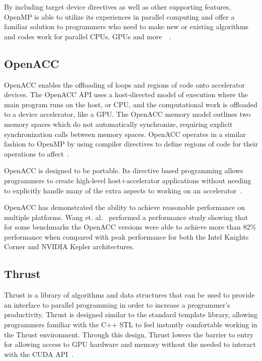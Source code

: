 By including target device directives as well as other supporting features, OpenMP is able to utilize its experiences in parallel computing and offer a familiar solution to programmers who need to make new or existing algorithms and codes work for parallel CPUs, GPUs and more~\cite{ayguade2010extending}~\cite{lee2010openmpc}.

\subsection*{\textbf{OpenACC}}

OpenACC enables the offloading of loops and regions of code onto accelerator devices.
%
The OpenACC API uses a host-directed model of execution where the main program runs on the host, or CPU, and the computational work is offloaded to a device accelerator, like a GPU.
%
The OpenACC memory model outlines two memory spaces which do not automatically synchronize, requiring explicit synchronization calls between memory spaces.
%
OpenACC operates in a similar fashion to OpenMP by using compiler directives to define regions of code for their operations to affect~\cite{wienke2012openacc}.

OpenACC is designed to be portable.
%
Its directive based programming allows programmers to create high-level host+accelerator applications without needing to explicitly handle many of the extra aspects to working on an accelerator~\cite{openacc}.

OpenACC has demonstrated the ability to achieve reasonable performance on multiple platforms.
%
Wang et. al.~\cite{wang2013performance} performed a performance study showing that for some benchmarks the OpenACC versions were able to achieve more than 82\% performance when compared with peak performance for both the Intel Knights Corner and NVIDIA Kepler architectures.

\subsection*{\textbf{Thrust}}

Thrust is a library of algorithms and data structures that can be used to provide an interface to parallel programming in order to increase a programmer's productivity.
%
Thrust is designed similar to the standard template library, allowing programmers familiar with the C++ STL to feel instantly comfortable working in the Thrust environment.
%
Through this design, Thrust lowers the barrier to entry for allowing access to GPU hardware and memory without the needed to interact with the CUDA API~\cite{hoberock2010thrust}.

